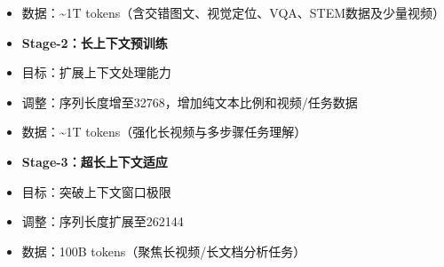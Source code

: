 \documentclass[zihao=false,fontset=windows]{ctexart}
\begin{document}
\begin{itemize}[label=\textcolor{feishuBlue}{\textbullet}]
\item 数据：\textasciitilde{}1T tokens（含交错图文、视觉定位、VQA、STEM数据及少量视频）

\end{itemize}

\begin{itemize}[label=\textcolor{feishuBlue}{3.}]
\item \textbf{Stage-2：长上下文预训练}

\end{itemize}

\begin{itemize}[label=\textcolor{feishuBlue}{\textbullet}]
\item 目标：扩展上下文处理能力

\end{itemize}

\begin{itemize}[label=\textcolor{feishuBlue}{\textbullet}]
\item 调整：序列长度增至32768，增加纯文本比例和视频/任务数据

\end{itemize}

\begin{itemize}[label=\textcolor{feishuBlue}{\textbullet}]
\item 数据：\textasciitilde{}1T tokens（强化长视频与多步骤任务理解）

\end{itemize}

\begin{itemize}[label=\textcolor{feishuBlue}{4.}]
\item \textbf{Stage-3：超长上下文适应}

\end{itemize}

\begin{itemize}[label=\textcolor{feishuBlue}{\textbullet}]
\item 目标：突破上下文窗口极限

\end{itemize}

\begin{itemize}[label=\textcolor{feishuBlue}{\textbullet}]
\item 调整：序列长度扩展至262144

\end{itemize}

\begin{itemize}[label=\textcolor{feishuBlue}{\textbullet}]
\item 数据：100B tokens（聚焦长视频/长文档分析任务）

\end{itemize}
\end{document}
